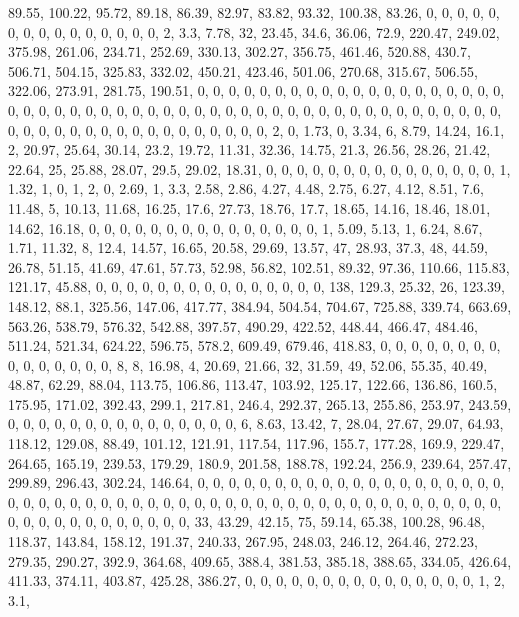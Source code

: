 \documentclass[
]{article}
\begin{document}
89.55, 100.22, 95.72, 89.18, 86.39, 82.97, 83.82, 93.32, 100.38, 83.26,
0, 0, 0, 0, 0, 0, 0, 0, 0, 0, 0, 0, 0, 0, 0, 2, 3.3, 7.78, 32, 23.45,
34.6, 36.06, 72.9, 220.47, 249.02, 375.98, 261.06, 234.71, 252.69,
330.13, 302.27, 356.75, 461.46, 520.88, 430.7, 506.71, 504.15, 325.83,
332.02, 450.21, 423.46, 501.06, 270.68, 315.67, 506.55, 322.06, 273.91,
281.75, 190.51, 0, 0, 0, 0, 0, 0, 0, 0, 0, 0, 0, 0, 0, 0, 0, 0, 0, 0, 0,
0, 0, 0, 0, 0, 0, 0, 0, 0, 0, 0, 0, 0, 0, 0, 0, 0, 0, 0, 0, 0, 0, 0, 0,
0, 0, 0, 0, 0, 0, 0, 0, 0, 0, 0, 0, 0, 0, 0, 0, 0, 0, 0, 0, 0, 0, 0, 0,
0, 0, 2, 0, 1.73, 0, 3.34, 6, 8.79, 14.24, 16.1, 2, 20.97, 25.64, 30.14,
23.2, 19.72, 11.31, 32.36, 14.75, 21.3, 26.56, 28.26, 21.42, 22.64, 25,
25.88, 28.07, 29.5, 29.02, 18.31, 0, 0, 0, 0, 0, 0, 0, 0, 0, 0, 0, 0, 0,
0, 0, 1, 1.32, 1, 0, 1, 2, 0, 2.69, 1, 3.3, 2.58, 2.86, 4.27, 4.48,
2.75, 6.27, 4.12, 8.51, 7.6, 11.48, 5, 10.13, 11.68, 16.25, 17.6, 27.73,
18.76, 17.7, 18.65, 14.16, 18.46, 18.01, 14.62, 16.18, 0, 0, 0, 0, 0, 0,
0, 0, 0, 0, 0, 0, 0, 0, 0, 1, 5.09, 5.13, 1, 6.24, 8.67, 1.71, 11.32, 8,
12.4, 14.57, 16.65, 20.58, 29.69, 13.57, 47, 28.93, 37.3, 48, 44.59,
26.78, 51.15, 41.69, 47.61, 57.73, 52.98, 56.82, 102.51, 89.32, 97.36,
110.66, 115.83, 121.17, 45.88, 0, 0, 0, 0, 0, 0, 0, 0, 0, 0, 0, 0, 0, 0,
0, 138, 129.3, 25.32, 26, 123.39, 148.12, 88.1, 325.56, 147.06, 417.77,
384.94, 504.54, 704.67, 725.88, 339.74, 663.69, 563.26, 538.79, 576.32,
542.88, 397.57, 490.29, 422.52, 448.44, 466.47, 484.46, 511.24, 521.34,
624.22, 596.75, 578.2, 609.49, 679.46, 418.83, 0, 0, 0, 0, 0, 0, 0, 0,
0, 0, 0, 0, 0, 0, 0, 8, 8, 16.98, 4, 20.69, 21.66, 32, 31.59, 49, 52.06,
55.35, 40.49, 48.87, 62.29, 88.04, 113.75, 106.86, 113.47, 103.92,
125.17, 122.66, 136.86, 160.5, 175.95, 171.02, 392.43, 299.1, 217.81,
246.4, 292.37, 265.13, 255.86, 253.97, 243.59, 0, 0, 0, 0, 0, 0, 0, 0,
0, 0, 0, 0, 0, 0, 0, 6, 8.63, 13.42, 7, 28.04, 27.67, 29.07, 64.93,
118.12, 129.08, 88.49, 101.12, 121.91, 117.54, 117.96, 155.7, 177.28,
169.9, 229.47, 264.65, 165.19, 239.53, 179.29, 180.9, 201.58, 188.78,
192.24, 256.9, 239.64, 257.47, 299.89, 296.43, 302.24, 146.64, 0, 0, 0,
0, 0, 0, 0, 0, 0, 0, 0, 0, 0, 0, 0, 0, 0, 0, 0, 0, 0, 0, 0, 0, 0, 0, 0,
0, 0, 0, 0, 0, 0, 0, 0, 0, 0, 0, 0, 0, 0, 0, 0, 0, 0, 0, 0, 0, 0, 0, 0,
0, 0, 0, 0, 0, 0, 0, 0, 0, 0, 0, 0, 0, 33, 43.29, 42.15, 75, 59.14,
65.38, 100.28, 96.48, 118.37, 143.84, 158.12, 191.37, 240.33, 267.95,
248.03, 246.12, 264.46, 272.23, 279.35, 290.27, 392.9, 364.68, 409.65,
388.4, 381.53, 385.18, 388.65, 334.05, 426.64, 411.33, 374.11, 403.87,
425.28, 386.27, 0, 0, 0, 0, 0, 0, 0, 0, 0, 0, 0, 0, 0, 0, 0, 1, 2, 3.1,
\end{document}
